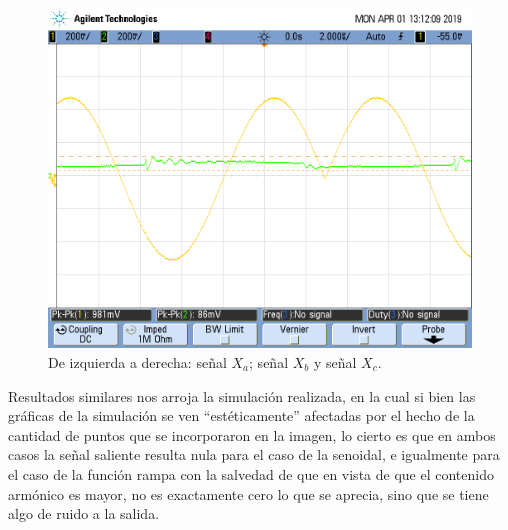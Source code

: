 \documentclass[../../ASSD_TP1_G7.tex]{subfiles}
\begin{document}
\begin{figure}[H]
\begin{centering}
\par\end{centering}
\begin{centering}
\includegraphics[scale=0.25]{Imagenes/ej_6_b_2}\caption{De izquierda a derecha: señal $X_{a}$; señal $X_{b}$ y señal $X_{c}$.}
\par\end{centering}
\end{figure}

Resultados similares nos arroja la simulación realizada, en la cual
si bien las gráficas de la simulación se ven ``estéticamente'' afectadas
por el hecho de la cantidad de puntos que se incorporaron en la imagen,
lo cierto es que en ambos casos la señal saliente resulta nula para
el caso de la senoidal, e igualmente para el caso de la función rampa
con la salvedad de que en vista de que el contenido armónico es mayor,
no es exactamente cero lo que se aprecia, sino que se tiene algo de
ruido a la salida.
\end{document}
